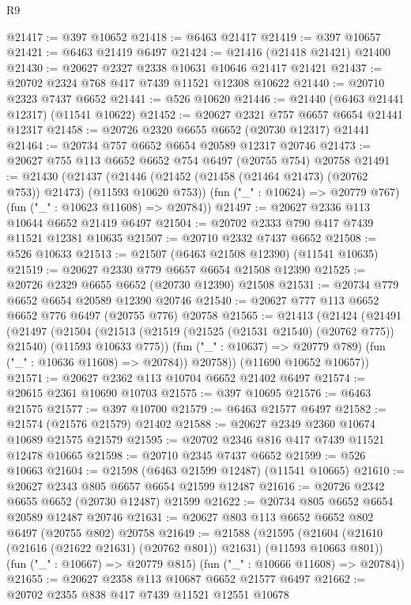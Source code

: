 \begin{lexlean}{R9}
\begin{coremodule}
@21417 := @397 @10652
@21418 := @6463 @21417
@21419 := @397 @10657
@21421 := @6463 @21419 @6497
@21424 := @21416 (@21418 @21421) @21400
@21430 := @20627 @2327 @2338 @10631 @10646 @21417 @21421
@21437 := @20702 @2324 @768 @417 @7439 @11521 @12308 @10622
@21440 := @20710 @2323 @7437 @6652
@21441 := @526 @10620
@21446 := @21440 (@6463 @21441 @12317) (@11541 @10622)
@21452 := @20627 @2321 @757 @6657 @6654 @21441 @12317
@21458 := @20726 @2320 @6655 @6652 (@20730 @12317) @21441
@21464 := @20734 @757 @6652 @6654 @20589 @12317 @20746
@21473 := @20627 @755 @113 @6652 @6652 @754 @6497 (@20755 @754) @20758
@21491 := @21430
    (@21437
      (@21446 (@21452 (@21458 (@21464 @21473) (@20762 @753)) @21473) (@11593 @10620 @753))
      (fun ("_" : @10624) => @20779 @767)
      (fun ("_" : @10623 @11608) => @20784))
@21497 := @20627 @2336 @113 @10644 @6652 @21419 @6497
@21504 := @20702 @2333 @790 @417 @7439 @11521 @12381 @10635
@21507 := @20710 @2332 @7437 @6652
@21508 := @526 @10633
@21513 := @21507 (@6463 @21508 @12390) (@11541 @10635)
@21519 := @20627 @2330 @779 @6657 @6654 @21508 @12390
@21525 := @20726 @2329 @6655 @6652 (@20730 @12390) @21508
@21531 := @20734 @779 @6652 @6654 @20589 @12390 @20746
@21540 := @20627 @777 @113 @6652 @6652 @776 @6497 (@20755 @776) @20758
@21565 := @21413
    (@21424
      (@21491
        (@21497
          (@21504
            (@21513 (@21519 (@21525 (@21531 @21540) (@20762 @775)) @21540) (@11593 @10633 @775))
            (fun ("_" : @10637) => @20779 @789)
            (fun ("_" : @10636 @11608) => @20784))
          @20758))
      (@11690 @10652 @10657))
@21571 := @20627 @2362 @113 @10704 @6652 @21402 @6497
@21574 := @20615 @2361 @10690 @10703
@21575 := @397 @10695
@21576 := @6463 @21575
@21577 := @397 @10700
@21579 := @6463 @21577 @6497
@21582 := @21574 (@21576 @21579) @21402
@21588 := @20627 @2349 @2360 @10674 @10689 @21575 @21579
@21595 := @20702 @2346 @816 @417 @7439 @11521 @12478 @10665
@21598 := @20710 @2345 @7437 @6652
@21599 := @526 @10663
@21604 := @21598 (@6463 @21599 @12487) (@11541 @10665)
@21610 := @20627 @2343 @805 @6657 @6654 @21599 @12487
@21616 := @20726 @2342 @6655 @6652 (@20730 @12487) @21599
@21622 := @20734 @805 @6652 @6654 @20589 @12487 @20746
@21631 := @20627 @803 @113 @6652 @6652 @802 @6497 (@20755 @802) @20758
@21649 := @21588
    (@21595
      (@21604 (@21610 (@21616 (@21622 @21631) (@20762 @801)) @21631) (@11593 @10663 @801))
      (fun ("_" : @10667) => @20779 @815)
      (fun ("_" : @10666 @11608) => @20784))
@21655 := @20627 @2358 @113 @10687 @6652 @21577 @6497
@21662 := @20702 @2355 @838 @417 @7439 @11521 @12551 @10678

\end{coremodule}
\end{lexlean}
